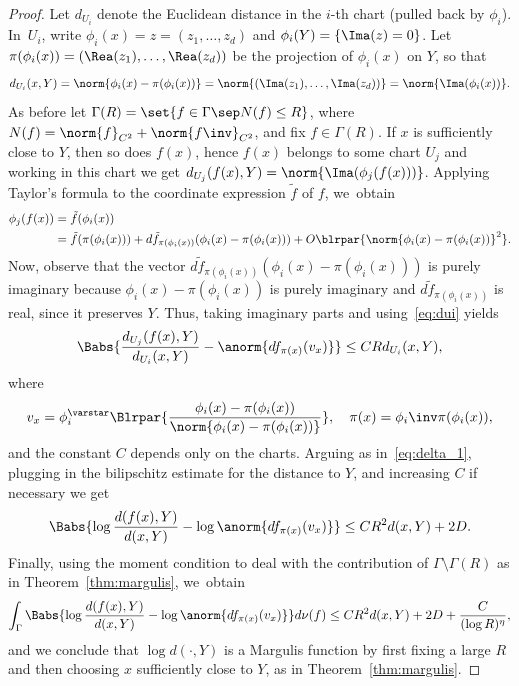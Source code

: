 \begin{proof}
Let $d_{U_i}$ denote the Euclidean distance in the $i$-th chart (pulled back by $\phi_i$). In~$U_i$, write
$\phi_i(x) = z = (z_1, \ldots, z_d)$ and $\phi_i(Y) = \{\Ima (z) = 0\}$.
Let $\pi(\phi_i(x)) = (\Rea(z_1), \ldots , \Rea(z_d))$ be the projection of $\phi_i(x)$ on $Y$,
so that
\begin{equation} \label{eq:dui}
d_{U_i}(x,Y) = \norm{ \phi_i(x) - \pi(\phi_i(x))} = \norm{(\Ima (z_1), \ldots , \Ima (z_d))} = \norm{\Ima(\phi_i(x))}.
\end{equation}
As before let $\Gamma(R) = \set{f\in \Gamma \sep N(f)\leq R}$, where
$N(f) = \norm{f}_{C^2} + \norm{f\inv}_{C^2}$,
and fix $f\in \Gamma(R)$. If $x$ is sufficiently close to $Y$, then so does $f(x)$, hence
$f(x)$ belongs to some chart $U_j$ and working in this chart we get
$d_{U_j}(f(x),Y) = \norm{\Ima(\phi_j(f(x)))}$.
Applying Taylor's formula to the coordinate expression $\tilde f$ of $f$, we~obtain
\begin{align*}
\notag \phi_j(f(x)) &= \tilde f(\phi_i(x)) \\& \notag = \tilde f (\pi( \phi_i(x))) + d \tilde f_{\pi( \phi_i(x))} (\phi_i(x) - \pi( \phi_i(x)))
+ O\blrpar{ \norm{ \phi_i(x) - \pi(\phi_i(x))}^2}.
\end{align*}
Now, observe that the vector $d \tilde f_{\pi( \phi_i(x))} (\phi_i(x) - \pi( \phi_i(x)))$ is purely imaginary
because $\phi_i(x) - \pi( \phi_i(x))$ is purely imaginary and $d \tilde f_{\pi( \phi_i(x))}$ is real,
since it preserves $Y$.
Thus, taking imaginary parts and using~\eqref{eq:dui} yields
\begin{equation*}
\Babs{ \frac{d_{U_j}(f(x), Y)}{d_{U_i}(x, Y) }- \anorm{df_{\pi( x)}(v_x) }}\leq C R d_{U_i}(x, Y),
\end{equation*}
where
\[
v_x = \phi_i^\varstar\Blrpar{\frac{\phi_i(x) - \pi( \phi_i(x))}{\norm{\phi_i(x) - \pi( \phi_i(x))}}},\quad
\pi(x) = \phi_i\inv \pi( \phi_i(x)),
\]
and the constant $C$ depends only on the charts.
Arguing as in~\eqref{eq:delta_1}, plugging in the bilipschitz estimate for the distance to $Y$, and increasing $C$ if necessary we get
\begin{equation*}
\Babs{\log \frac{d (f(x), Y)}{d (x, Y) }- \log \anorm{df_{\pi( x)}(v_x) }}\leq C R^2 d(x, Y) + 2D.
\end{equation*}
Finally, using the moment condition to deal
with the contribution of $\Gamma\setminus \Gamma(R)$ as in Theorem~\ref{thm:margulis}, we~obtain
\begin{equation*}
\int_\Gamma
\Babs{\log \frac{d(f(x), Y)}{d(x, Y) }- \log \anorm{df_{\pi(x)}(v_x) }} d\nu(f) \leq C R^2 d(x, Y)
+ 2D + \frac{C}{(\log R)^\eta},
\end{equation*}
and we conclude that $\log d(\cdot , Y)$ is a Margulis function by first fixing a large $R$ and then choosing
$x$ sufficiently close to $Y$, as in Theorem~\ref{thm:margulis}.
\end{proof}

